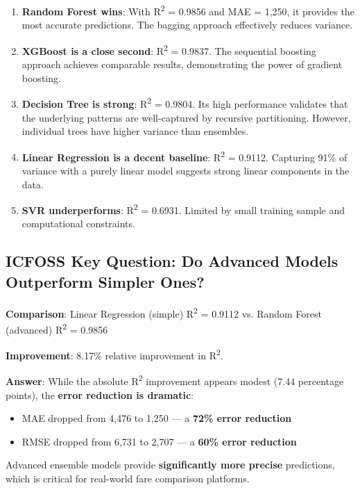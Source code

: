 \documentclass[12pt, a4paper]{article}
\newcommand{\rupee}{\text{₹}}
\begin{document}
\begin{enumerate}[leftmargin=*]
    \item \textbf{Random Forest wins}: With R\textsuperscript{2} = 0.9856 and MAE = \rupee1,250, it provides the most accurate predictions. The bagging approach effectively reduces variance.
    
    \item \textbf{XGBoost is a close second}: R\textsuperscript{2} = 0.9837. The sequential boosting approach achieves comparable results, demonstrating the power of gradient boosting.
    
    \item \textbf{Decision Tree is strong}: R\textsuperscript{2} = 0.9804. Its high performance validates that the underlying patterns are well-captured by recursive partitioning. However, individual trees have higher variance than ensembles.
    
    \item \textbf{Linear Regression is a decent baseline}: R\textsuperscript{2} = 0.9112. Capturing 91\% of variance with a purely linear model suggests strong linear components in the data.
    
    \item \textbf{SVR underperforms}: R\textsuperscript{2} = 0.6931. Limited by small training sample and computational constraints.
\end{enumerate}

\subsection{ICFOSS Key Question: Do Advanced Models Outperform Simpler Ones?}

\begin{importantbox}
\textbf{Comparison}: Linear Regression (simple) R\textsuperscript{2} = 0.9112 vs. Random Forest (advanced) R\textsuperscript{2} = 0.9856

\textbf{Improvement}: 8.17\% relative improvement in R\textsuperscript{2}.

\textbf{Answer}: While the absolute R\textsuperscript{2} improvement appears modest (7.44 percentage points), the \textbf{error reduction is dramatic}:
\begin{itemize}
    \item MAE dropped from \rupee4,476 to \rupee1,250 — a \textbf{72\% error reduction}
    \item RMSE dropped from \rupee6,731 to \rupee2,707 — a \textbf{60\% error reduction}
\end{itemize}
Advanced ensemble models provide \textbf{significantly more precise} predictions, which is critical for real-world fare comparison platforms.
\end{importantbox}
\end{document}
